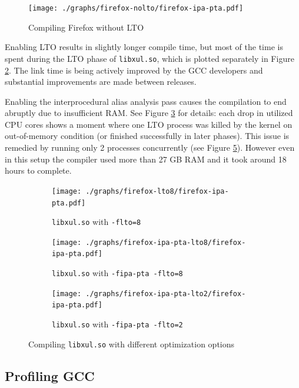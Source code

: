 \begin{figure}[!ht]
	\centering
	\texttt{[image: ./graphs/firefox-nolto/firefox-ipa-pta.pdf]}
	\caption{Compiling Firefox without LTO}
	\label{figure-firefox-nolto}
\end{figure}

Enabling LTO results in slightly longer compile time, but most of the time is
spent during the LTO phase of {\tt libxul.so}, which is plotted separately in Figure
\ref{figure-firefox-lto8}. The link time is being actively improved by the GCC
developers and substantial improvements are made between releases.

Enabling the interprocedural alias analysis pass causes the compilation to end
abruptly due to insufficient RAM.  See Figure \ref{figure-firefox-ipa-pta-lto8}
for details: each drop in utilized CPU cores shows a moment where one LTO
process was killed by the kernel on out-of-memory condition (or finished successfully in
later phases). This issue is remedied by running only 2 processes concurrently
(see Figure \ref{figure-firefox-ipa-pta-lto2}).  However even in this setup the
compiler used more than 27 GB RAM and it took around 18 hours to complete.

\begin{figure}
\begin{subfigure}[b]{\textwidth}
	\centering
	\texttt{[image: ./graphs/firefox-lto8/firefox-ipa-pta.pdf]}
	\caption{{\tt libxul.so} with {\tt -flto=8}}
	\label{figure-firefox-lto8}
\end{subfigure}
\begin{subfigure}[b]{\textwidth}
	\centering
	\texttt{[image: ./graphs/firefox-ipa-pta-lto8/firefox-ipa-pta.pdf]}
	\caption{{\tt libxul.so} with {\tt -fipa-pta -flto=8}}
	\label{figure-firefox-ipa-pta-lto8}
\end{subfigure}
\begin{subfigure}[b]{\textwidth}
	\centering
	\texttt{[image: ./graphs/firefox-ipa-pta-lto2/firefox-ipa-pta.pdf]}
	\caption{{\tt libxul.so} with {\tt -fipa-pta -flto=2}}
	\label{figure-firefox-ipa-pta-lto2}
\end{subfigure}
\caption{Compiling {\tt libxul.so} with different optimization options}
\end{figure}

\subsection{Profiling GCC}

